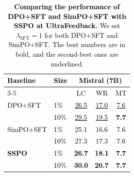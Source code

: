\documentclass{article} %
\newcommand\rebuttal[1]{\textcolor{black}{#1}}
\begin{document}
\setlength{\intextsep}{0pt} 
\begin{table} 
    \centering
    \small 
    \setlength{\tabcolsep}{2.1mm} 
    \caption{\rebuttal{\textbf{Comparing the performance of DPO+SFT and SimPO+SFT with SSPO at UltraFeedback.} We set $\lambda_{\mathrm{SFT}}=1$ for both DPO+SFT and SimPO+SFT. The best numbers are in bold, and the second-best ones are underlined.}}
    \label{tab:DPO_SimPO+SFT}
    \vspace{-2mm}
    \begin{tabular}{ll ccc}
        \toprule
      
        \multirow{2}{*}{\rebuttal{\textbf{Baseline}}} & \multirow{2}{*}{\rebuttal{\textbf{Size}}} & \multicolumn{3}{c}{\rebuttal{\textbf{Mistral (7B)}}} \\
        \cmidrule(lr){3-5}
         & & \rebuttal{LC} & \rebuttal{WR} & \rebuttal{MT} \\
        \midrule
  
        \rebuttal{DPO+SFT} & \rebuttal{1\%} & \rebuttal{\underline{26.5}} & \rebuttal{\underline{17.0}} & \rebuttal{\underline{7.6}} \\
            & \rebuttal{10\%} & \rebuttal{\underline{29.5}} & \rebuttal{\underline{19.5}} & \rebuttal{\textbf{7.7}} \\
        \midrule

        \rebuttal{SimPO+SFT} & \rebuttal{1\%} & \rebuttal{25.1} & \rebuttal{16.6} & \rebuttal{7.6} \\
            & \rebuttal{10\%}  & \rebuttal{27.3} & \rebuttal{17.3} & \rebuttal{7.6} \\
        \midrule
        
        \midrule
        \rebuttal{\textbf{SSPO}} & \rebuttal{1\%} & \rebuttal{\textbf{26.7}} & \rebuttal{\textbf{18.1}} & \rebuttal{\textbf{7.7}} \\ 
                      & \rebuttal{10\%}  & \rebuttal{\textbf{30.0}} & \rebuttal{\textbf{20.7}} & \rebuttal{\textbf{7.7}} \\
        \bottomrule 
    \end{tabular}
\end{table}
\end{document}
